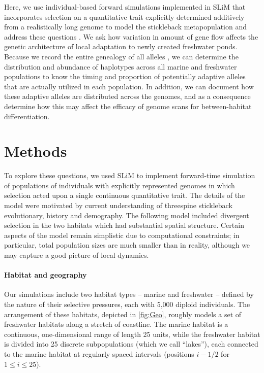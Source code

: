 \documentclass{article}
\begin{document}
Here, we use individual-based forward simulations implemented in SLiM that incorporates selection on a quantitative trait
explicitly determined additively from a realistically long genome to model the stickleback metapopulation and address these questions \citep{haller2017slim,haller2018slim3}. 
We ask how variation in amount of gene flow affects the genetic architecture of local adaptation to newly created freshwater ponds.
Because we record the entire genealogy of all alleles \citep{kelleher2018efficient}, 
we can determine the distribution and abundance of haplotypes across all marine and freshwater populations to know the timing and proportion of potentially adaptive alleles that are actually utilized in each population. 
In addition, we can document how these adaptive alleles are distributed across the genomes, and as a consequence determine how this may affect the efficacy of genome scans for between-habitat differentiation. 


\section*{Methods}

To explore these questions, we used SLiM \citep{haller2017slim,haller2018slim3} to implement forward-time simulation of populations of individuals with explicitly represented genomes in which selection acted upon a single continuous quantitative trait. 
The details of the model were motivated by current understanding of threespine stickleback evolutionary, history and demography.
The following model included divergent selection in the two habitats which had substantial spatial structure.
Certain aspects of the model remain simplistic due to computational constraints;
in particular, total population sizes are much smaller than in reality,
although we may capture a good picture of local dynamics. 

\paragraph{Habitat and geography}
Our simulations include two habitat types -- marine and freshwater -- defined by the nature of their selective pressures, each with 5,000 diploid individuals. 
The arrangement of these habitats, depicted in \autoref{fig:Geo}, roughly models a set of freshwater habitats along a stretch of coastline. 
The marine habitat is a continuous, one-dimensional range of length 25 units, while the freshwater habitat is divided into 25 discrete subpopulations (which we call ``lakes''), each connected to the marine habitat at regularly spaced intervals (positions $i - 1/2$ for $1 \le i \le 25$).
\end{document}
